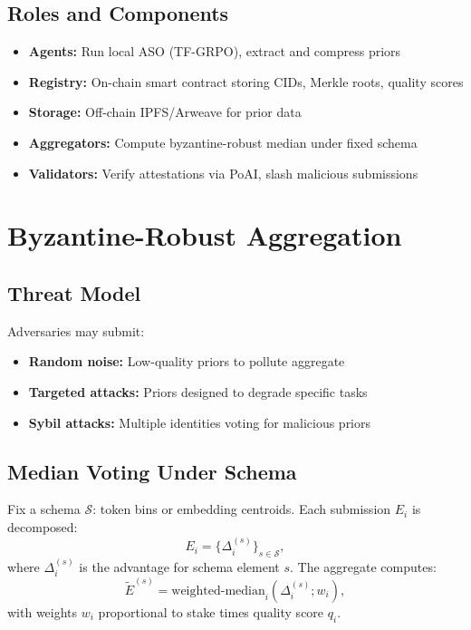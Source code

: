 \documentclass[11pt]{article}
\begin{document}
\subsection{Roles and Components}
\begin{itemize}[leftmargin=1.1em]
  \item \textbf{Agents:} Run local ASO (TF-GRPO), extract and compress priors
  \item \textbf{Registry:} On-chain smart contract storing CIDs, Merkle roots, quality scores
  \item \textbf{Storage:} Off-chain IPFS/Arweave for prior data
  \item \textbf{Aggregators:} Compute byzantine-robust median under fixed schema
  \item \textbf{Validators:} Verify attestations via PoAI, slash malicious submissions
\end{itemize}




\section{Byzantine-Robust Aggregation}
\subsection{Threat Model}
Adversaries may submit:
\begin{itemize}[leftmargin=1.1em]
  \item \textbf{Random noise:} Low-quality priors to pollute aggregate
  \item \textbf{Targeted attacks:} Priors designed to degrade specific tasks
  \item \textbf{Sybil attacks:} Multiple identities voting for malicious priors
\end{itemize}

\subsection{Median Voting Under Schema}
Fix a schema \(\mathcal{S}\): token bins or embedding centroids. Each submission \(E_i\) is decomposed:
\begin{equation}
E_i = \{\Delta_i^{(s)}\}_{s \in \mathcal{S}},
\end{equation}
where \(\Delta_i^{(s)}\) is the advantage for schema element \(s\). The aggregate computes:
\begin{equation}
\tilde{E}^{(s)} = \text{weighted-median}_i(\Delta_i^{(s)}; w_i),
\end{equation}
with weights \(w_i\) proportional to stake times quality score \(q_i\).
\end{document}
